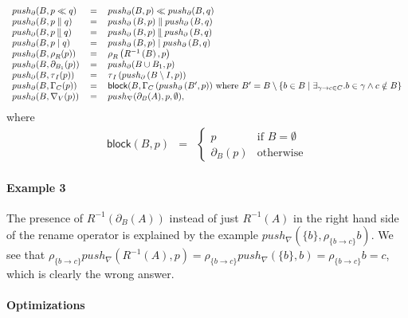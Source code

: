 \documentclass{article}
\providecommand{\leftmerge}{\mathbin{\mathrel{\llfloor}}}
\begin{document}
\[\begin{tabular}{lll}
$push_{\partial }(B,p\ll q)$ & $=$ & $push_{\partial }(B,p)\ll
push_{\partial }(B,q)$ \\ 
$push_{\partial }(B,p\parallel q)$ & $=$ & $push_{\partial }\left(
B,p\right) \parallel push_{\partial }\left( B,q\right) $ \\ 
$push_{\partial }(B,p\leftmerge q)$ & $=$ & $push_{\partial }\left(
B,p\right) \leftmerge push_{\partial }\left( B,q\right) $ \\ 
$push_{\partial }(B,p\mid q)$ & $=$ & $push_{\partial }\left( B,p\right)
\mid push_{\partial }\left( B,q\right) $ \\ 
$push_{\partial }(B,\rho _{R}(p))$ & $=$ & $\rho _{R}\left( R^{-1}\left(
B\right) ,p\right) $ \\ 
$push_{\partial }(B,\partial _{B_{1}}(p))$ & $=$ & $push_{\partial }(B\cup
B_{1},p)$ \\ 
$push_{\partial }(B,\tau _{I}(p))$ & $=$ & $\tau _{I}\left( push_{\partial
}\left( B\setminus I,p\right) \right) $ \\ 
$push_{\partial }(B,\Gamma _{C}(p))$ & $=$ & $\mathsf{block}(B,\Gamma
_{C}\left( push_{\partial }\left( B^{\prime },p\right) \right) $ where $%
B^{\prime }=B\setminus \left\{ b\in B\mid \exists _{\gamma \rightarrow c\in
C}.b\in \gamma \wedge c\notin B\right\} $ \\ 
$push_{\partial }(B,\nabla _{V}(p))$ & $=$ & $push_{\nabla }(\partial
_{B}(A),p,\emptyset ),$%
\end{tabular}%
\]%
where%
\[
\begin{array}{lll}
\mathsf{block}(B,p) & = & \left\{ 
\begin{array}{ll}
p & \text{if }B=\emptyset  \\ 
\partial _{B}(p) & \text{otherwise}%
\end{array}%
\right. 
\end{array}%
\]

\paragraph{Example 3}

The presence of $R^{-1}(\partial _{B}(A))$ instead of just $R^{-1}(A)$ in
the right hand side of the rename operator is explained by the example $%
push_{\nabla }(\{b\},\rho _{\{b\rightarrow c\}}b)$. We see that $\rho
_{\{b\rightarrow c\}}push_{\nabla }(R^{-1}(A),p)=\rho _{\{b\rightarrow
c\}}push_{\nabla }(\{b\},b)=\rho _{\{b\rightarrow c\}}b=c$, which is clearly
the wrong answer.

\paragraph{Optimizations}
\end{document}
